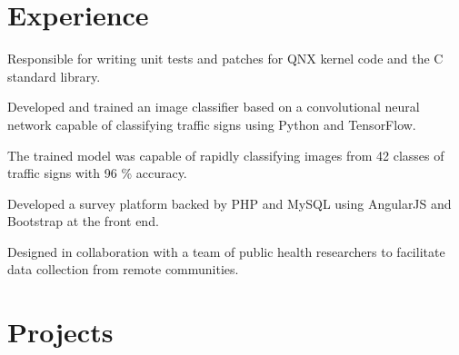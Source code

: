 \documentclass[]{chowes-resume}
\begin{document}
\begin{minipage}[t]{0.66\textwidth} 


\section{Experience}

\vspace{\topsep} %
\begin{tightemize}
\item Responsible for writing unit tests and patches for QNX kernel code and the C standard library.
\end{tightemize}
\sectionsep

\begin{tightemize}
\item Developed and trained an image classifier based on a convolutional neural network capable of classifying traffic signs using Python and TensorFlow.
\item The trained model was capable of rapidly classifying images from 42 classes of traffic signs with 96 \% accuracy.
\end{tightemize}
\sectionsep

\begin{tightemize}
\item Developed a survey platform backed by PHP and MySQL using AngularJS and Bootstrap at the front end. 
\item Designed in collaboration with a team of public health researchers to facilitate data collection from remote communities.
\end{tightemize}
\sectionsep


\section{Projects}


\end{minipage}
\end{document}
